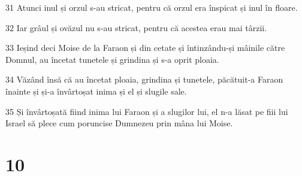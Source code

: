 \par 31 Atunci inul și orzul s-au stricat, pentru că orzul era înspicat și inul în floare.
\par 32 Iar grâul și ovăzul nu s-au stricat, pentru că acestea erau mai târzii.
\par 33 Ieșind deci Moise de la Faraon și din cetate și întinzându-și mâinile către Domnul, au încetat tunetele și grindina și s-a oprit ploaia.
\par 34 Văzând însă că au încetat ploaia, grindina și tunetele, păcătuit-a Faraon înainte și și-a învârtoșat inima și el și slugile sale.
\par 35 Și învârtoșată fiind inima lui Faraon și a slugilor lui, el n-a lăsat pe fiii lui Israel să plece cum poruncise Dumnezeu prin mâna lui Moise.

\chapter{10}

